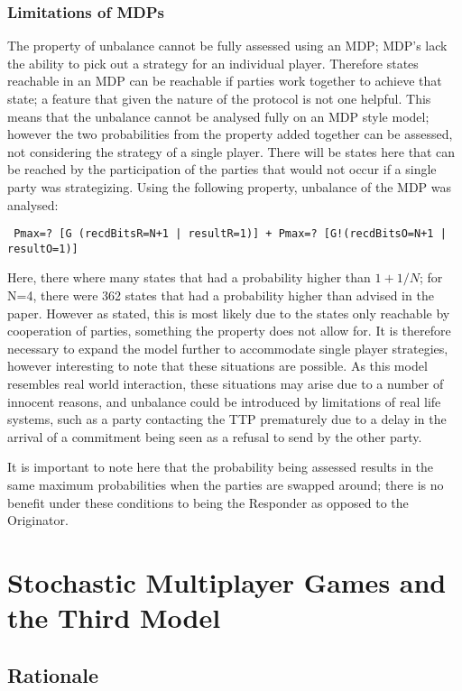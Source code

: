 \documentclass{l4proj}
\begin{document}
\subsection{Limitations of MDPs}

The property of unbalance cannot be fully assessed using an MDP; MDP's lack the ability to pick out a strategy for an individual player. Therefore states reachable in an MDP can be reachable if parties work together to achieve that state; a feature that given the nature of the protocol is not one helpful. This means that the unbalance cannot be analysed fully on an MDP style model; however the two probabilities from the property added together can be assessed, not considering the strategy of a single player. There will be states here that can be reached by the participation of the parties that would not occur if a single party was strategizing. Using the following property, unbalance of the MDP was analysed:
\begin{lstlisting}
 Pmax=? [G (recdBitsR=N+1 | resultR=1)] + Pmax=? [G!(recdBitsO=N+1 | resultO=1)]
\end{lstlisting}

Here, there where many states that had a probability higher than $1+1/N$; for N=4, there were 362 states that had a probability higher than advised in the paper. However as stated, this is most likely due to the states only reachable by cooperation of parties, something the property does not allow for. It is therefore necessary to expand the model further to accommodate single player strategies, however interesting to note that these situations are possible. As this model resembles real world interaction, these situations may arise due to a number of innocent reasons, and unbalance could be introduced by limitations of real life systems, such as a party contacting the TTP prematurely due to a delay in the arrival of a commitment being seen as a refusal to send by the other party.


It is important to note here that the probability being assessed results in the same maximum probabilities when the parties are swapped around; there is no benefit under these conditions to being the Responder as opposed to the Originator.

\chapter{Stochastic Multiplayer Games and the Third Model}

\section{Rationale}
\end{document}
